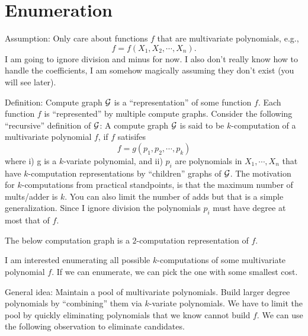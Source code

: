 \documentclass[12pt]{article}
\author{author}
\begin{document}
\maketitle




\section{Enumeration}

Assumption: Only care about functions $f$ that are multivariate polynomials,
e.g., 
\[
    f = f(X_1, X_2, \cdots, X_n).
\]
I am going to ignore division and minus for now. 
I also don't really know how to handle the coefficients, I am somehow magically
assuming they don't exist (you will see later).

Definition: Compute graph $\mathcal{G}$ is a ``representation'' of some function $f$.
Each function $f$ is ``represented'' by multiple compute graphs.
Consider the following ``recursive'' definition of $\mathcal{G}$:
A compute graph $\mathcal{G}$ is said to be $k$-computation of a multivariate
polynomial $f$, if $f$ satisifes
\[
    f = g(p_1, p_2, \cdots, p_k)
\]
where 
i) g is a $k$-variate polynomial, and 
ii) $p_i$ are polynomials in $X_1, \cdots, X_n$ that have $k$-computation
representations by ``children'' graphs of $\mathcal{G}$. 
The motivation for $k$-computations from practical standpoints, is that the
maximum number of mults/adder is $k$. 
You can also limit the number of adds but that is a simple generalization.
Since I ignore division the polynomials $p_i$ must have degree at most that of $f$.


The below computation graph is a $2$-computation representation of $f$.

I am interested enumerating all possible $k$-computations of some multivariate
polynomial $f$.
If we can enumerate, we can pick the one with some smallest cost.

General idea: Maintain a pool of multivariate polynomials. 
Build larger degree polynomials by ``combining'' them via $k$-variate polynomials.  
We have to limit the pool by quickly eliminating polynomials that we know cannot
build $f$. 
We can use the following observation to eliminate candidates.
\end{document}
